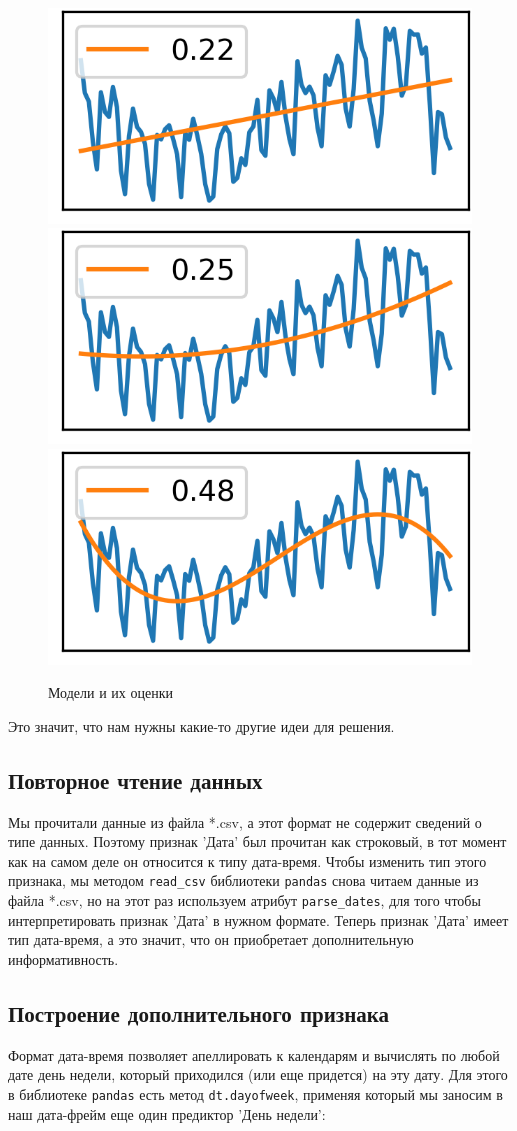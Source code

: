 \documentclass[a4paper,12pt]{article}
\begin{document}
\begin{figure}[!h]
	\centering
	\includegraphics[width=0.25\linewidth]{pictures/1. Линейная модель}
	\hspace{0.01\linewidth}
	\includegraphics[width=0.25\linewidth]{pictures/2. Квадратичная модель}
	\hspace{0.01\linewidth}
	\includegraphics[width=0.25\linewidth]{pictures/3. Кубическая модель}
	\\
	\caption{Модели и их оценки}
\end{figure}
\noindent
Это значит, что нам нужны какие-то другие идеи для решения.

\subsection{Повторное чтение данных}
Мы прочитали данные из файла *.csv, а этот формат не содержит сведений о типе данных. Поэтому признак 'Дата' был прочитан как строковый, в тот момент как на самом деле он относится к типу дата-время. Чтобы изменить тип этого признака, мы методом \texttt{read\_csv} библиотеки \texttt{pandas} снова читаем данные из файла *.csv, но на этот раз используем атрибут \texttt{parse\_dates}, для того чтобы интерпретировать признак 'Дата' в нужном формате. Теперь признак 'Дата' имеет тип дата-время, а это значит, что он приобретает дополнительную информативность.

\subsection{Построение дополнительного признака}
Формат дата-время позволяет апеллировать к календарям и вычислять по любой дате день недели, который приходился (или еще придется) на эту дату. Для этого в библиотеке \texttt{pandas} есть метод \texttt{dt.dayofweek}, применяя который мы заносим в наш дата-фрейм еще один предиктор 'День недели':
\end{document}
